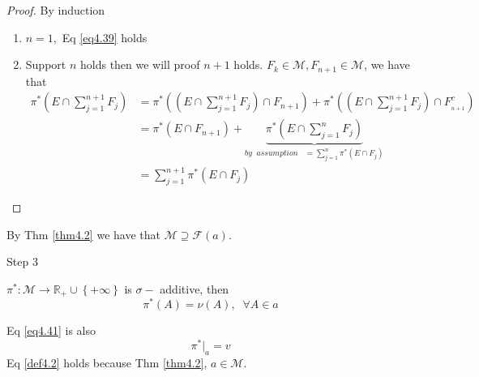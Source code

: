 \begin{proof}
	By induction
	\begin{enumerate}
		\item $ n = 1, $ Eq \ref{eq4.39} holds
		\item Support $ n $ holds then we will proof $  n + 1  $ holds.
	 ${F_k} \in \mathcal{M},{F_{n + 1}} \in \mathcal{M}$, we have that
	 \begin{equation}
	 \begin{split}
	 {\pi ^*}\left( {E \cap \sum\limits_{j = 1}^{n + 1} {{F_j}} } \right) & = {\pi ^*}\left( {\left( {E \cap \sum\limits_{j = 1}^{n + 1} {{F_j}} } \right) \cap {F_{n + 1}}} \right) + {\pi ^*}\left( {\left( {E \cap \sum\limits_{j = 1}^{n + 1} {{F_j}} } \right) \cap F_{_{n + 1}}^c} \right)\\
	                                                                      & = {\pi ^*}\left( {E \cap {F_{n + 1}}} \right) + \underbrace {{\pi ^*}\left( {E \cap \sum\limits_{j = 1}^n {{F_j}} } \right)}_{by\;\;assumption\;\;\; = \sum\limits_{j = 1}^n {{\pi ^*}\left( {E \cap {F_j}} \right)} }\\
	                                                                      & = \sum\limits_{j = 1}^{n + 1} {{\pi ^*}\left( {E \cap {F_j}} \right)} 
	 \end{split}
	 \label{eq4.40}
	 \end{equation}
	\end{enumerate}
\end{proof}

By Thm \ref{thm4.2} we have that $ \mathcal{M} \supseteq \mathcal{F}(a). $

{\large Step 3}

\begin{theorem}
	${\pi ^*}:\mathcal{M} \to {\mathbb{R}_ + } \cup \left\{ { + \infty } \right\}$ is $ \sigma- $ additive, then 
	\begin{equation}
	{\pi ^*}\left( A \right) = \nu \left( A \right),\;\;\forall A \in a
	\label{eq4.41}
	\end{equation}
	\label{thm4.3}
\end{theorem}

\begin{remark}
	Eq \ref{eq4.41} is also
	\begin{equation}
	{\pi ^*}{|_a} = v
	\label{eq4.42}
	\end{equation}
	Eq \ref{def4.2} holds because Thm \ref{thm4.2}, $ a \in \mathcal{M}. $
	\label{rmk4.3}
\end{remark}

